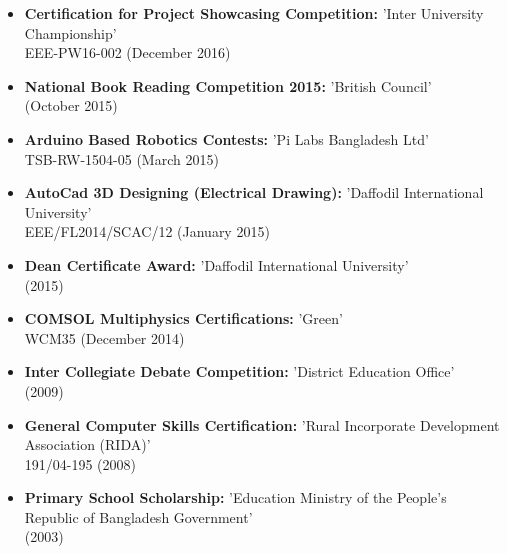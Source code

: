 \documentclass[11pt,a4paper,sans]{moderncv}        %
\begin{document}
\begin{itemize}

\item \textbf{Certification for Project Showcasing Competition:} 'Inter University Championship' \\ EEE-PW16-002 (December 2016)

\vspace{6pt}

\item \textbf{National Book Reading Competition 2015:} 'British Council' \\ (October 2015)

\vspace{6pt}

\item \textbf{Arduino Based Robotics Contests:} 'Pi Labs Bangladesh Ltd' \\ TSB-RW-1504-05 (March 2015)

\vspace{6pt}

\item \textbf{AutoCad 3D Designing (Electrical Drawing):} 'Daffodil International University' \\ EEE/FL2014/SCAC/12 (January 2015)

\vspace{6pt}

\item \textbf{Dean Certificate Award:} 'Daffodil International University'\\(2015)

\vspace{6pt}

\item \textbf{COMSOL Multiphysics Certifications:} 'Green'\\ WCM35 (December 2014)

\vspace{6pt}

\item \textbf{Inter Collegiate Debate Competition:} 'District Education Office'\\ (2009)

\vspace{6pt}

\item \textbf{General Computer Skills Certification:} 'Rural Incorporate Development Association (RIDA)'\\191/04-195 (2008)

\vspace{6pt}

\item \textbf{Primary School Scholarship:} 'Education Ministry of the People's Republic of Bangladesh Government'\\(2003)

\end{itemize}
\end{document}

